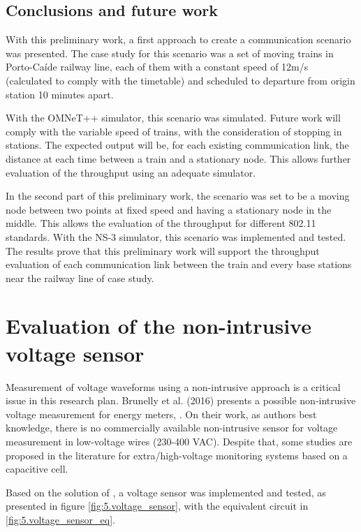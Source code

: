 \subsection{Conclusions and future work}

	With this preliminary work, a first approach to create a communication scenario was presented. 
	The case study for this scenario was a set of moving trains in Porto-Caíde railway line, each of them with a constant speed of 12m/s (calculated to comply with the timetable) and scheduled to departure from origin station 10 minutes apart.
	
	With the OMNeT++ simulator, this scenario was simulated. Future work will comply with the variable speed of trains, with the consideration of stopping in stations. The expected output will be, for each existing communication link, the distance at each time between a train and a stationary node. This allows further evaluation of the throughput using an adequate simulator.
	
	In the second part of this preliminary work, the scenario was set to be a moving node between two points at fixed speed and having a stationary node in the middle. This allows the evaluation of the throughput for different 802.11 standards. With the NS-3 simulator, this scenario was implemented and tested. The results prove that this preliminary work will support the throughput evaluation of each communication link between the train and every base stations near the railway line of case study.




\section{Evaluation of the non-intrusive voltage sensor}

	Measurement of voltage waveforms using a non-intrusive approach is a critical issue in this research plan. 
	Brunelly et al. (2016) presents a possible non-intrusive voltage measurement for energy meters, \cite{brunelli2016}.
	On their work, as authors best knowledge, there is no commercially available non-intrusive sensor for voltage measurement in low-voltage wires (230-400 VAC). 
	Despite that, some studies are proposed in the literature for extra/high-voltage monitoring systems based on a capacitive cell.
	
	Based on the solution of \cite{brunelli2016}, a voltage sensor was implemented and tested, as presented in figure \ref{fig:5.voltage_sensor}, with the equivalent circuit in \ref{fig:5.voltage_sensor_eq}. 
	
